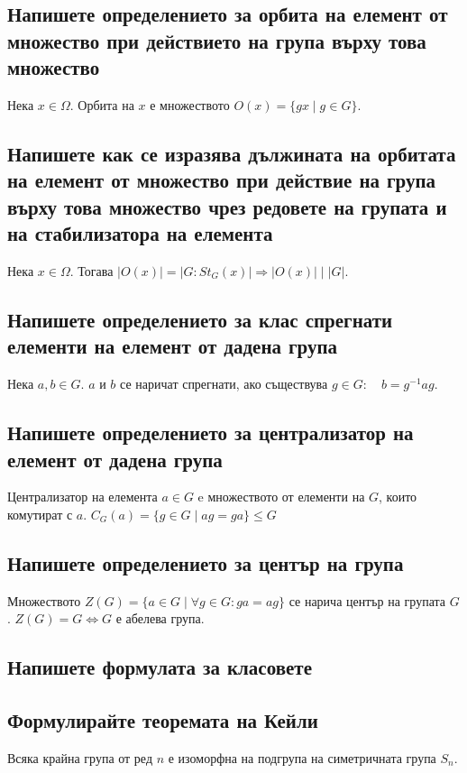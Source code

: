 \documentclass[10pt]{article}
\begin{document}
\subsection*{Напишете определението за орбита на елемент от множество при действието на група върху това множество}
Нека $x \in \Omega$. Орбита на $x$ е множеството $O(x) = \{gx \mid g \in G\}$.

\subsection*{Напишете как се изразява дължината на орбитата на елемент от множество при действие на група върху това множество чрез редовете на групата и на стабилизатора на елемента}
Нека $x \in \Omega$. Тогава $|O(x)| = |G:St_G(x)| \Rightarrow |O(x)| \mid |G|$.

\subsection*{Напишете определението за клас спрегнати елементи на елемент от дадена група}
Нека $a, b \in G$. $a$ и $b$ се наричат спрегнати, ако съществува $g \in G: \quad b = g^{-1}ag$.

\subsection*{Напишете определението за централизатор на елемент от дадена група}
Централизатор на елемента $a \in G$ e множеството от елементи на $G$, които комутират с $a$. $C_G(a) = \{g \in G \mid ag = ga\} \leq G$

\subsection*{Напишете определението за център на група}
Множеството $Z(G) = \{a \in G \mid \forall g \in G: ga = ag\}$ се нарича център на групата $G$. $Z(G) = G \Leftrightarrow G$ е абелева група.

\subsection*{Напишете формулата за класовете}


\subsection*{Формулирайте теоремата на Кейли}
Всяка крайна група от ред $n$ е изоморфна на подгрупа на симетричната група $S_n$.
\end{document}
